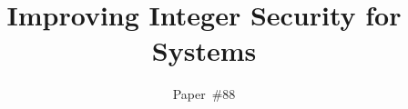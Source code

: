 \documentclass[10pt,letterpaper,twocolumn]{article}
\begin{document}
\title{Improving Integer Security for Systems}
\author{Paper~\#88}
\date{}
\maketitle








%





\end{document}
